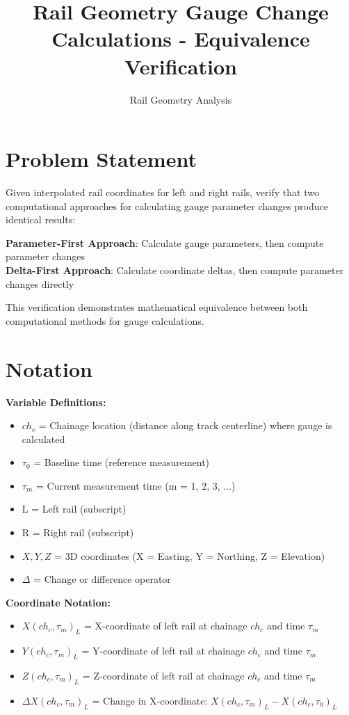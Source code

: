 \documentclass{article}
\title{Rail Geometry Gauge Change Calculations - Equivalence Verification}
\author{Rail Geometry Analysis}
\date{}
\begin{document}
\maketitle

\section{Problem Statement}
Given interpolated rail coordinates for left and right rails, verify that two computational approaches for calculating gauge parameter changes produce identical results:

\textbf{Parameter-First Approach}: Calculate gauge parameters, then compute parameter changes\\
\textbf{Delta-First Approach}: Calculate coordinate deltas, then compute parameter changes directly

This verification demonstrates mathematical equivalence between both computational methods for gauge calculations.

\section{Notation}
\textbf{Variable Definitions:}
\begin{itemize}
\item $ch_c$ = Chainage location (distance along track centerline) where gauge is calculated
\item $\tau_0$ = Baseline time (reference measurement)
\item $\tau_m$ = Current measurement time (m = 1, 2, 3, ...)
\item $\text{L}$ = Left rail (subscript)
\item $\text{R}$ = Right rail (subscript)
\item $X, Y, Z$ = 3D coordinates (X = Easting, Y = Northing, Z = Elevation)
\item $\Delta$ = Change or difference operator
\end{itemize}

\textbf{Coordinate Notation:}
\begin{itemize}
\item $X(ch_c, \tau_m)_L$ = X-coordinate of left rail at chainage $ch_c$ and time $\tau_m$
\item $Y(ch_c, \tau_m)_L$ = Y-coordinate of left rail at chainage $ch_c$ and time $\tau_m$
\item $Z(ch_c, \tau_m)_L$ = Z-coordinate of left rail at chainage $ch_c$ and time $\tau_m$
\item $\Delta X(ch_c, \tau_m)_L$ = Change in X-coordinate: $X(ch_c, \tau_m)_L - X(ch_c, \tau_0)_L$
\end{itemize}
\end{document}
